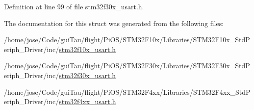 Definition at line 99 of file stm32f30x\-\_\-usart.\-h.



The documentation for this struct was generated from the following files\-:\begin{DoxyCompactItemize}
\item 
/home/jose/\-Code/gui\-Tau/flight/\-Pi\-O\-S/\-S\-T\-M32\-F10x/\-Libraries/\-S\-T\-M32\-F10x\-\_\-\-Std\-Periph\-\_\-\-Driver/inc/\hyperlink{stm32f10x__usart_8h}{stm32f10x\-\_\-usart.\-h}\item 
/home/jose/\-Code/gui\-Tau/flight/\-Pi\-O\-S/\-S\-T\-M32\-F30x/\-Libraries/\-S\-T\-M32\-F30x\-\_\-\-Std\-Periph\-\_\-\-Driver/inc/\hyperlink{stm32f30x__usart_8h}{stm32f30x\-\_\-usart.\-h}\item 
/home/jose/\-Code/gui\-Tau/flight/\-Pi\-O\-S/\-S\-T\-M32\-F4xx/\-Libraries/\-S\-T\-M32\-F4xx\-\_\-\-Std\-Periph\-\_\-\-Driver/inc/\hyperlink{stm32f4xx__usart_8h}{stm32f4xx\-\_\-usart.\-h}\end{DoxyCompactItemize}
